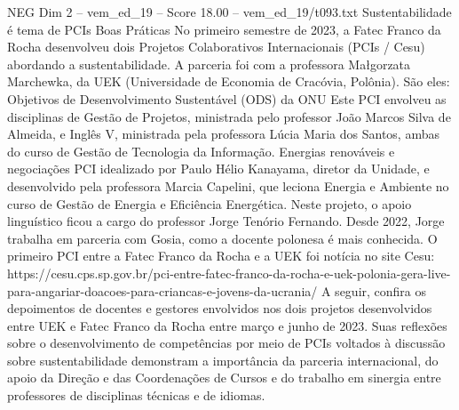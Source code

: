 \begin{textsample}{NEG Dim 2 – vem\_ed\_19 – Score 18.00 – vem\_ed\_19/t093.txt}  \label{ex:f2_neg_184}
Sustentabilidade é tema de PCIs Boas Práticas No primeiro semestre de 2023, a Fatec Franco da Rocha desenvolveu dois Projetos Colaborativos Internacionais (PCIs / Cesu) abordando a sustentabilidade.
A parceria foi com a professora Małgorzata Marchewka, da UEK (Universidade de Economia de Cracóvia, Polônia).
São eles: Objetivos de Desenvolvimento Sustentável (ODS) da ONU Este PCI envolveu as disciplinas de Gestão de Projetos, ministrada pelo professor João Marcos Silva de Almeida, e Inglês V, ministrada pela professora Lúcia Maria dos Santos, ambas do curso de Gestão de Tecnologia da Informação.
Energias renováveis e negociações PCI idealizado por Paulo Hélio Kanayama, diretor da Unidade, e desenvolvido pela professora Marcia Capelini, que leciona Energia e Ambiente no curso de Gestão de Energia e Eficiência Energética.
Neste projeto, o apoio linguístico ficou a cargo do professor Jorge Tenório Fernando.
Desde 2022, Jorge trabalha em parceria com Gosia, como a docente polonesa é mais conhecida.
O primeiro PCI entre a Fatec Franco da Rocha e a UEK foi notícia no site Cesu: https://cesu.cps.sp.gov.br/pci-entre-fatec-franco-da-rocha-e-uek-polonia-gera-live-para-angariar-doacoes-para-criancas-e-jovens-da-ucrania/ A seguir, confira os depoimentos de docentes e gestores envolvidos nos dois projetos desenvolvidos entre UEK e Fatec Franco da Rocha entre março e junho de 2023.
Suas reflexões sobre o desenvolvimento de competências por meio de PCIs voltados à discussão sobre sustentabilidade demonstram a importância da parceria internacional, do apoio da Direção e das Coordenações de Cursos e do trabalho em sinergia entre professores de disciplinas técnicas e de idiomas.

\end{textsample}
